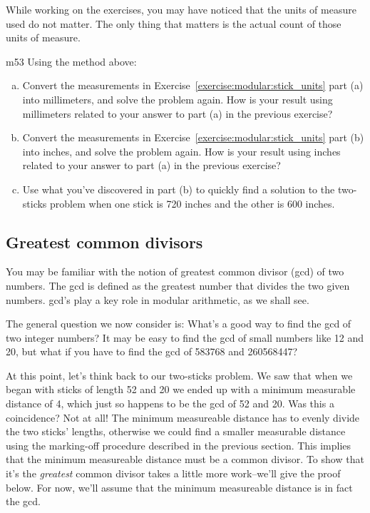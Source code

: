 While working on the exercises, you may have noticed that the units of measure used do not matter.  The only thing that matters is the actual count of those units of measure.  

\begin{exercise}{m53}
Using the method above:
\begin{enumerate}[(a)]
\item
Convert the measurements in Exercise~\ref{exercise:modular:stick_units} part (a) into millimeters, and solve the problem again. How is your result using millimeters related to your answer to part (a) in the previous exercise?
\item
Convert the measurements in Exercise~\ref{exercise:modular:stick_units} part (b) into inches, and solve the problem again. How is your result using inches related to your answer to part (a) in the previous exercise?
\item
Use what you've discovered in part (b) to quickly find a solution to the two-sticks problem when one stick is 720 inches and the other is 600 inches.
\end{enumerate}
\end{exercise}

\subsection{Greatest common divisors}\label{sec:gcd}
You may be  familiar with the notion of greatest common divisor (gcd) of two numbers.  The gcd is defined as the greatest number that divides the two given numbers. gcd's play a key role in modular arithmetic, as we shall see. 

The general question we now consider is: What's a good way to find the gcd of two integer numbers? It may be easy to find the gcd of small numbers like 12 and 20, but what if you have to find the gcd of 583768 and 260568447? 

At this point, let's think back to our two-sticks problem. We saw that when we began with sticks of length 52 and 20 we ended up with a minimum measurable distance of 4, which just so happens to be the gcd of 52 and 20. Was this a coincidence? Not at all!  The minimum measureable distance has to evenly divide the two sticks' lengths, otherwise we could find a smaller measurable distance using the marking-off procedure described in the previous section. This implies that the minimum measureable distance must be a common divisor. To show that it's the \emph{greatest} common divisor takes a little more work--we'll give the proof below. For now, we'll assume that the minimum measureable distance is in fact the gcd. 

